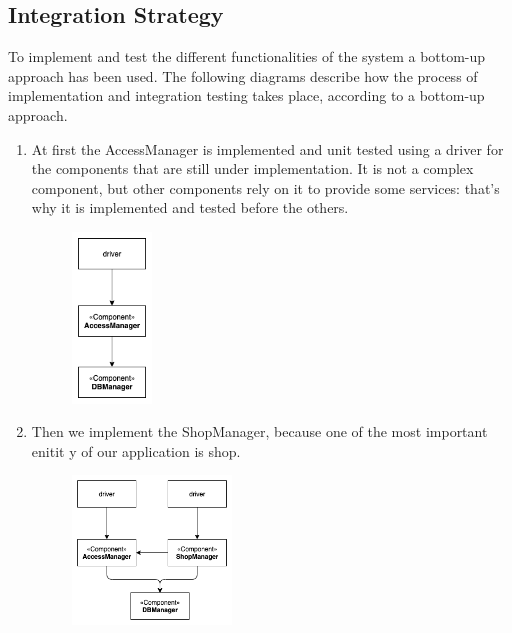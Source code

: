 \subsection{Integration Strategy}
\vspace{0.5cm}

To implement and test the different functionalities of the system a bottom-up approach has been used. The following diagrams describe how the process of implementation and integration testing takes place, according to a bottom-up approach. \\

\begin{enumerate}
    
\item At first the AccessManager is implemented and unit tested using a driver for the components that are still under implementation. It is not a complex component, but other components rely on it to provide some services: that’s why it is implemented and tested before the others. \\
\begin{figure}[H]
  \centering
  \includegraphics[width=0.2\textwidth,keepaspectratio]{images/IS/IS1.png}
\end{figure}

\item Then we implement the ShopManager, because one of the most important enitit y of our application is shop.\\
\begin{figure}[H]
  \centering
  \includegraphics[width=0.4\textwidth,keepaspectratio]{images/IS/IS2.png}
\end{figure}


\end{enumerate}
